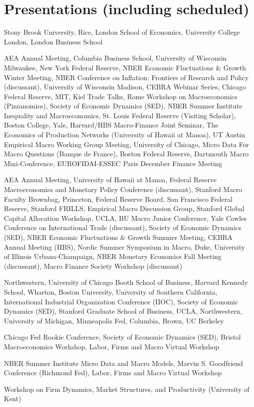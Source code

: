 \documentclass[letterpaper]{article}
\begin{document}
\section*{Presentations (including scheduled)}
\begin{description}[labelindent=0pt, labelwidth=0.7in, labelsep*=1em, leftmargin =!, font=\normalfont]
\item[2027] Stony Brook University, Rice, London School of Economics, University College London, London Business School
\item[2026] AEA Annual Meeting, Columbia Business School, University of Wisconsin Milwaukee, New York Federal Reserve, NBER Economic Fluctuations \& Growth Winter Meeting, NBER Conference on Inflation: Frontiers of Research and Policy (discussant), University of Wisconsin Madison, CEBRA Webinar Series, Chicago Federal Reserve, MIT, Kiel Trade Talks, Rome Workshop on Macroeconomics (Pizzanomics), Society of Economic Dynamics (SED), NBER Summer Institute Inequality and Macroeconomics, St. Louis Federal Reserve (Visiting Scholar), Boston College, Yale, Harvard/HBS Macro-Finance Joint Seminar, The Economics of Production Networks (University of Hawaii at Manoa), UT Austin Empirical Macro Working Group Meeting, University of Chicago, Micro Data For Macro Questions (Banque de France), Boston Federal Reserve, Dartmouth Macro Mini-Conference, EUROFIDAI-ESSEC Paris December Finance Meeting
\item[2025] AEA Annual Meeting, University of Hawaii at Manoa, Federal Reserve Macroeconomics and Monetary Policy Conference (discussant), Stanford Macro Faculty Brownbag, Princeton, Federal Reserve Board, San Francisco Federal Reserve, Stanford FRILLS, Empirical Macro Discussion Group, Stanford Global Capital Allocation Workshop, UCLA, BU Macro Junior Conference, Yale Cowles Conference on International Trade (discussant), Society of Economic Dynamics (SED), NBER Economic Fluctuations \& Growth Summer Meeting, CEBRA Annual Meeting (HBS), Nordic Summer Symposium in Macro, Duke, University of Illinois Urbana-Champaign, NBER Monetary Economics Fall Meeting (discussant), Macro Finance Society Workshop (discussant) 
\item[2024] Northwestern, University of Chicago Booth School of Business, Harvard Kennedy School, Wharton, Boston University, University of Southern California, International Industrial Organization Conference (IIOC), Society of Economic Dynamics (SED), Stanford Graduate School of Business, UCLA, Northwestern, University of Michigan, Minneapolis Fed, Columbia, Brown, UC Berkeley %
\item[2023] Chicago Fed Rookie Conference, Society of Economic Dynamics (SED), Bristol Macroeconomics Workshop, Labor, Firms and Macro Virtual Workshop
\item[2022] NBER Summer Institute Micro Data and Macro Models, Marvin S. Goodfriend Conference (Richmond Fed), Labor, Firms and Macro Virtual Workshop
\item[2021] Workshop on Firm Dynamics, Market Structures, and Productivity (University of Kent) 
\end{description}
\end{document}
